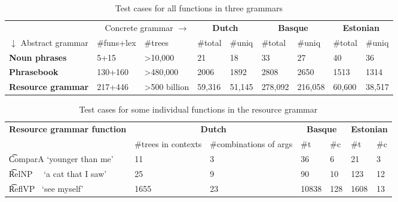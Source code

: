 \begin{table}[h]
\centering
\begin{tabular}{|lll|ll|ll|ll|}
\hline
\multicolumn{3}{|r}{Concrete grammar $\rightarrow$}              &
                                                                   \multicolumn{2}{|c}{\bf Dutch} & \multicolumn{2}{|c}{\bf Basque} & \multicolumn{2}{|c|}{\bf Estonian} \\
$\downarrow$ Abstract grammar & \#funs+lex & \#trees  &
                                                                 \#total & \#uniq & \#total & \#uniq  & \#total  & \#uniq \\ \hline
{\bf Noun phrases}     & 5+15          & \textgreater{}10,000          & 21    & 18     & 33      & 27      & 40       & 36     \\ \hline
{\bf Phrasebook}       & 130+160         & \textgreater{}480,000       & 2006  & 1892   & 2808    & 2650    & 1513     & 1314   \\ \hline
{\bf Resource grammar} & 217+446         & \textgreater{}500 billion   & 59,316 & 51,145  & 278,092  & 216,058  & 60,600    & 38,517   \\ \hline
\end{tabular}
\caption{Test cases for all functions in three grammars}
\label{results}
\end{table}

\begin{table}[h]
\centering
\begin{tabular}{|l|ll|ll|ll|}
\hline
{\bf Resource grammar function} &\multicolumn{2}{|c}{\bf Dutch} &
                                                                  \multicolumn{2}{|c}{\bf Basque} & \multicolumn{2}{|c|}{\bf Estonian} \\
                               &  \#trees in contexts & \#combinations of args
                                                                                                  &\#t
                                                                                                    
                               & \#c & \#t &
                                                                    \#c\\ \hline
\t{ComparA} `younger than me'  &  11      & 3     & 36     & 6     & 21      & 3   \\
\t{RelNP~~} `a cat that I saw' &  25      & 9     & 90     & 10    & 123     & 12 \\
 \t{ReflVP~} `see myself'      &  1655    & 23    & 10838  &  128  &1608     & 13   \\


\hline
\end{tabular}
\caption{Test cases for some individual functions in the resource grammar}
\label{results_indiv}
\end{table}

